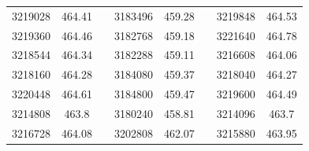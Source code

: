 \documentclass[12pt]{mwart}
\begin{document}
\begin{table}[H]
\begin{tabular}{cclcclcc}
		3219028                                                  & 464.41                                                        &  & 3183496                                                  & 459.28                                                        &  & 3219848                                                  & 464.53                                                        \\
		3219360                                                  & 464.46                                                        &  & 3182768                                                  & 459.18                                                        &  & 3221640                                                  & 464.78                                                        \\
		3218544                                                  & 464.34                                                        &  & 3182288                                                  & 459.11                                                        &  & 3216608                                                  & 464.06                                                        \\
		3218160                                                  & 464.28                                                        &  & 3184080                                                  & 459.37                                                        &  & 3218040                                                  & 464.27                                                        \\
		3220448                                                  & 464.61                                                        &  & 3184800                                                  & 459.47                                                        &  & 3219600                                                  & 464.49                                                        \\
		3214808                                                  & 463.8                                                         &  & 3180240                                                  & 458.81                                                        &  & 3214096                                                  & 463.7                                                         \\
		3216728                                                  & 464.08                                                        &  & 3202808                                                  & 462.07                                                        &  & 3215880                                                  & 463.95                                                        \\

\end{tabular}
\end{table}
\end{document}
